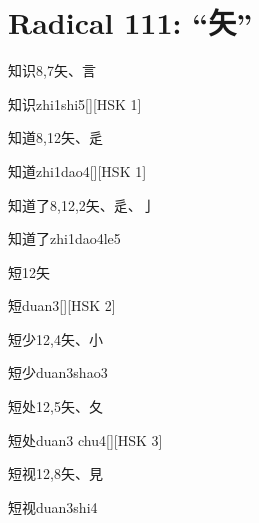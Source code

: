
\section*{Radical 111: ``⽮''}

\begin{entry}{知识}{8,7}{⽮、⾔}
  \begin{phonetics}{知识}{zhi1shi5}[][HSK 1]
  \end{phonetics}
\end{entry}

\begin{entry}{知道}{8,12}{⽮、⾡}
  \begin{phonetics}{知道}{zhi1dao4}[][HSK 1]
  \end{phonetics}
\end{entry}

\begin{entry}{知道了}{8,12,2}{⽮、⾡、⼅}
  \begin{phonetics}{知道了}{zhi1dao4le5}
  \end{phonetics}
\end{entry}

\begin{entry}{短}{12}{⽮}
  \begin{phonetics}{短}{duan3}[][HSK 2]
  \end{phonetics}
\end{entry}

\begin{entry}{短少}{12,4}{⽮、⼩}
  \begin{phonetics}{短少}{duan3shao3}
  \end{phonetics}
\end{entry}

\begin{entry}{短处}{12,5}{⽮、⼡}
  \begin{phonetics}{短处}{duan3 chu4}[][HSK 3]
  \end{phonetics}
\end{entry}

\begin{entry}{短视}{12,8}{⽮、⾒}
  \begin{phonetics}{短视}{duan3shi4}
  \end{phonetics}
\end{entry}

